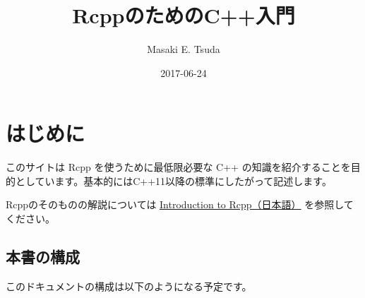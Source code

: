 \documentclass[]{book}
\title{RcppのためのC++入門}
\author{Masaki E. Tsuda}
\date{2017-06-24}
\begin{document}
\maketitle

{
\setcounter{tocdepth}{1}
\tableofcontents
}
\chapter*{はじめに}

このサイトは Rcpp を使うために最低限必要な C++
の知識を紹介することを目的としています。基本的にはC++11以降の標準にしたがって記述します。

Rcppのそのものの解説については
\href{https://www.gitbook.com/book/teuder/introduction-to-rcpp/details/ja}{Introduction
to Rcpp（日本語）} を参照してください。

\section{本書の構成}

このドキュメントの構成は以下のようになる予定です。
\end{document}
